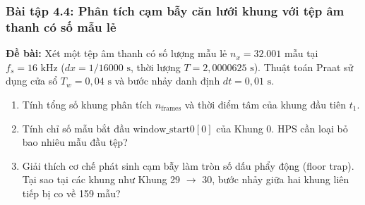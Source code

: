 \subsubsection*{Bài tập 4.4: Phân tích cạm bẫy căn lưới khung với tệp âm thanh có số mẫu lẻ}
\textbf{Đề bài:} Xét một tệp âm thanh có số lượng mẫu lẻ $n_x = 32.001\text{ mẫu}$ tại $f_s = 16\text{ kHz}$ ($dx = 1/16000\text{ s}$, thời lượng $T = 2{,}0000625\text{ s}$). Thuật toán Praat sử dụng cửa sổ $T_w = 0{,}04\text{ s}$ và bước nhảy danh định $dt = 0{,}01\text{ s}$.
\begin{enumerate}[label=(\alph*)]
    \item Tính tổng số khung phân tích $n_{\text{frames}}$ và thời điểm tâm của khung đầu tiên $t_1$.
    \item Tính chỉ số mẫu bắt đầu $\text{window\_start0}[0]$ của Khung 0. HPS cần loại bỏ bao nhiêu mẫu đầu tệp?
    \item Giải thích cơ chế phát sinh cạm bẫy làm tròn số dấu phẩy động (floor trap). Tại sao tại các khung như Khung 29 $\to$ 30, bước nhảy giữa hai khung liên tiếp bị co về 159 mẫu?
\end{enumerate}

